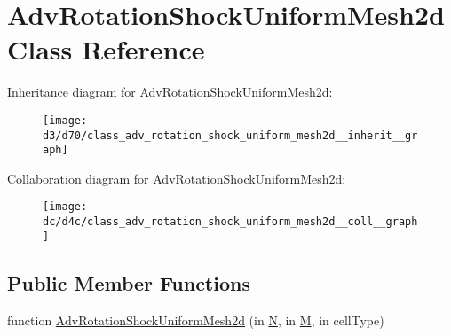 \hypertarget{class_adv_rotation_shock_uniform_mesh2d}{}\section{Adv\+Rotation\+Shock\+Uniform\+Mesh2d Class Reference}
\label{class_adv_rotation_shock_uniform_mesh2d}


Inheritance diagram for Adv\+Rotation\+Shock\+Uniform\+Mesh2d\+:
\nopagebreak
\begin{figure}[H]
\begin{center}
\leavevmode
\texttt{[image: d3/d70/class\_adv\_rotation\_shock\_uniform\_mesh2d\_\_inherit\_\_graph]}
\end{center}
\end{figure}


Collaboration diagram for Adv\+Rotation\+Shock\+Uniform\+Mesh2d\+:
\nopagebreak
\begin{figure}[H]
\begin{center}
\leavevmode
\texttt{[image: dc/d4c/class\_adv\_rotation\_shock\_uniform\_mesh2d\_\_coll\_\_graph]}
\end{center}
\end{figure}
\subsection*{Public Member Functions}
\begin{DoxyCompactItemize}
\item 
function \hyperlink{class_adv_rotation_shock_uniform_mesh2d_a108369a47e494034da13c2bacd0059c1}{Adv\+Rotation\+Shock\+Uniform\+Mesh2d} (in \hyperlink{class_adv_rotation_uniform_mesh2d_a10a366e7084faf231cd15555c8f48956}{N}, in \hyperlink{class_adv_rotation_uniform_mesh2d_a6ae00c25344d111a585e32e30954b63b}{M}, in cell\+Type)
\end{DoxyCompactItemize}
